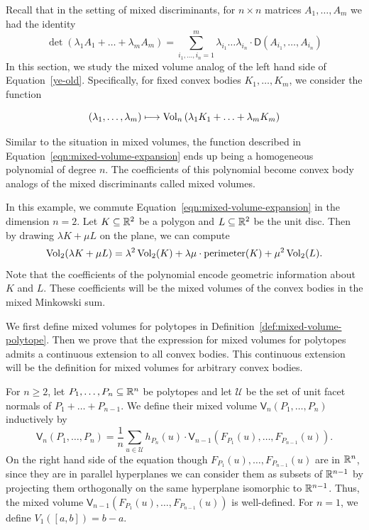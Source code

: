\documentclass{puthesis-UG}
\begin{document}
Recall that in the setting of mixed discriminants, for $n \times n$ matrices $A_1, \ldots, A_m$ we had the identity
\begin{equation} \label{ye-old}
	\det (\lambda_1 A_1 + \ldots + \lambda_m A_m) = \sum_{i_1, \ldots, i_n = 1}^m \lambda_{i_1} \ldots \lambda_{i_n} \cdot \mathsf{D}(A_{i_1}, \ldots, A_{i_n})
\end{equation}
In this section, we study the mixed volume analog of the left hand side of Equation~\ref{ye-old}. Specifically, for fixed convex bodies $K_1, \ldots, K_m$, we consider the function

\begin{equation} \label{eqn:mixed-volume-expansion}
	(\lambda_1, \ldots, \lambda_m) \longmapsto \operatorname{Vol}_n \left (\lambda_1 K_1 + \ldots + \lambda_m K_m \right )
\end{equation}

Similar to the situation in mixed volumes, the function described in Equation~\ref{eqn:mixed-volume-expansion} ends up being a homogeneous polynomial of degree $n$. The coefficients of this polynomial become convex body analogs of the mixed discriminants called mixed volumes. 

\begin{example} \label{example:small-case}
	In this example, we commute Equation~\ref{eqn:mixed-volume-expansion} in the dimension $n = 2$. Let $K \subseteq \mathbb{R}^2$ be a polygon and $L \subseteq \mathbb{R}^2$ be the unit disc. Then by drawing $\lambda K + \mu L$ on the plane, we can compute 
	\[
		\operatorname{Vol}_2 (\lambda K + \mu L) = \lambda^2 \operatorname{Vol}_2(K) + \lambda \mu \cdot \text{perimeter}(K) + \mu^2 \operatorname{Vol}_2(L). 
	\]
	Note that the coefficients of the polynomial encode geometric information about $K$ and $L$. These coefficients will be the mixed volumes of the convex bodies in the mixed Minkowski sum. 
\end{example}

We first define mixed volumes for polytopes in Definition~\ref{def:mixed-volume-polytope}. Then we prove that the expression for mixed volumes for polytopes admits a continuous extension to all convex bodies. This continuous extension will be the definition for mixed volumes for arbitrary convex bodies.

\begin{defn} \label{def:mixed-volume-polytope}
	For $n \geq 2$, let $P_1, \ldots, P_n \subseteq \mathbb{R}^n$ be polytopes and let $\mathcal{U}$ be the set of unit facet normals of $P_1 + \ldots + P_{n-1}$. We define their mixed volume $\mathsf{V}_n(P_1, \ldots, P_n)$ inductively by 
	\[
		\mathsf{V}_n(P_1, \ldots, P_n) = \frac{1}{n} \sum_{u \in \mathcal{U}} h_{P_n}(u) \cdot \mathsf{V}_{n-1} (F_{P_1}(u), \ldots, F_{P_{n-1}}(u)).
	\]
	On the right hand side of the equation though $F_{P_1}(u), \ldots, F_{P_{n-1}}(u)$ are in $\mathbb{R}^n$, since they are in parallel hyperplanes we can consider them as subsets of $\mathbb{R}^{n-1}$ by projecting them orthogonally on the same hyperplane isomorphic to $\mathbb{R}^{n-1}$. Thus, the mixed volume $\mathsf{V}_{n-1}(F_{P_1}(u), \ldots, F_{P_{n-1}}(u))$ is well-defined. For $n = 1$, we define $V_1 ([a, b]) = b-a$. 
\end{defn}
\end{document}
